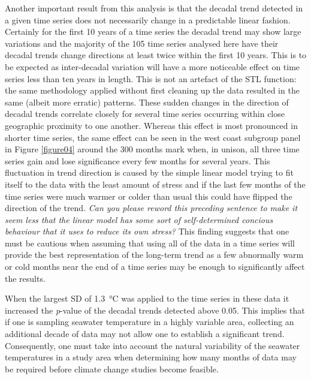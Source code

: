 \documentclass{ametsoc}
\begin{document}
Another important result from this analysis is that the decadal trend detected in a given time series does not necessarily change in a predictable linear fashion. Certainly for the first 10 years of a time series the decadal trend may show large variations and the majority of the 105 time series analysed here have their decadal trends change directions at least twice within the first 10 years. This is to be expected as inter-decadal variation will have a more noticeable effect on time series less than ten years in length. This is not an artefact of the STL function: the same methodology applied without first cleaning up the data resulted in the same (albeit more erratic) patterns. These sudden changes in the direction of decadal trends correlate closely for several time series occurring within close geographic proximity to one another. Whereas this effect is most pronounced in shorter time series, the same effect can be seen in the west coast subgroup panel in Figure \ref{figure04} around the 300 months mark when, in unison, all three time series gain and lose significance every few months for several years. This fluctuation in trend direction is caused by the simple linear model trying to fit itself to the data with the least amount of stress and if the last few months of the time series were much warmer or colder than usual this could have flipped the direction of the trend. \emph{Can you please reword this preceding sentence to make it seem less that the linear model has some sort of self-determined concious behaviour that it uses to reduce its own stress?} This finding suggests that one must be cautious when assuming that using all of the data in a time series will provide the best representation of the long-term trend as a few abnormally warm or cold months near the end of a time series may be enough to significantly affect the results.

When the largest SD of \SI{1.3}{\degreeCelsius} was applied to the time series in these data it increased the \emph{p}-value of the decadal trends detected above 0.05. This implies that if one is sampling seawater temperature in a highly variable area, collecting an additional decade of data may not allow one to establish a significant trend. Consequently, one must take into account the natural variability of the seawater temperatures in a study area when determining how many months of data may be required before climate change studies become feasible.
\end{document}
